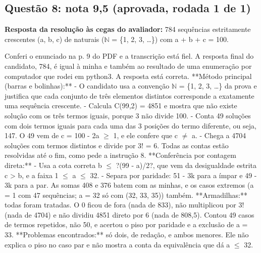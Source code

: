\documentclass{article}%
\begin{document}
\subsection*{Questão 8: nota 9,5 (aprovada, rodada 1 de 1)}%
\textbf{Resposta da resolução às cegas do avaliador:} 784 sequências estritamente crescentes (a, b, c) de naturais ($\mathbb{N}$ = \{1, 2, 3, \ldots{}\}) com a + b + c = 100.\par %
Conferi o enunciado na p. 9 do PDF e a transcrição está fiel. A resposta final do candidato, 784, é igual à minha e também ao resultado de uma enumeração por computador que rodei em python3. A resposta está correta.\newline%
\newline%
**Método principal (barras e bolinhas):**\newline%
{-} O candidato usa a convenção $\mathbb{N}$ = \{1, 2, 3, \ldots{}\} da prova e justifica que cada conjunto de três elementos distintos corresponde a exatamente uma sequência crescente.\newline%
{-} Calcula C(99,2) = 4851 e mostra que não existe solução com os três termos iguais, porque 3 não divide 100.\newline%
{-} Conta 49 soluções com dois termos iguais para cada uma das 3 posições do termo diferente, ou seja, 147. O 49 vem de c = 100 - 2a $\geq$ 1, e ele confere que c $\neq$ a.\newline%
{-} Chega a 4704 soluções com termos distintos e divide por 3! = 6. Todas as contas estão resolvidas até o fim, como pede a instrução 8.\newline%
\newline%
**Conferência por contagem direta:**\newline%
{-} Usa a cota correta b $\leq$ ?(99 - a)/2?, que vem da desigualdade estrita c > b, e a faixa 1 $\leq$ a $\leq$ 32.\newline%
{-} Separa por paridade: 51 - 3k para a ímpar e 49 - 3k para a par. As somas 408 e 376 batem com as minhas, e os casos extremos (a = 1 com 47 sequências; a = 32 só com (32, 33, 35)) também.\newline%
\newline%
**Armadilhas:** todas foram tratadas. O 0 ficou de fora (nada de 833), não multiplicou por 3! (nada de 4704) e não dividiu 4851 direto por 6 (nada de 808,5). Contou 49 casos de termos repetidos, não 50, e acertou o piso por paridade e a exclusão de a = 33.\newline%
\newline%
**Problemas encontrados:** só dois, de redação, e ambos menores. Ele não explica o piso no caso par e não mostra a conta da equivalência que dá a $\leq$ 32.\newline%
\end{document}
